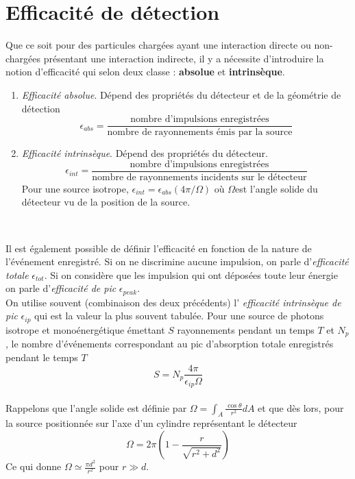 \section{Efficacité de détection}%
Que ce soit pour des particules chargées ayant une interaction 
directe ou non-chargées présentant une interaction indirecte, il 
y a nécessite d'introduire la notion d'efficacité qui selon 
deux classe : \textbf{absolue} et \textbf{intrinsèque}.
\begin{enumerate}
\item \textit{Efficacité absolue}. Dépend des propriétés du 
détecteur et de la géométrie de détection
\begin{equation}
\epsilon_{abs}=\frac{\mbox{nombre d'impulsions enregistr\'ees}
}{\mbox{nombre de rayonnements \'emis par la source}}
\end{equation}
\item \textit{Efficacité intrinsèque}. Dépend des propriétés du
détecteur.
\begin{equation}
\epsilon_{int}=\frac{\mbox{nombre d'impulsions enregistr\'ees}
}{\mbox{nombre de rayonnements incidents sur le d\'etecteur}}
\end{equation}
Pour une source isotrope, $\epsilon_{int}=\epsilon_{abs} (4\pi/
\Omega)$ où $\Omega$est l'angle solide du détecteur vu de la 
position de la source.
\end{enumerate}\ 

Il est également possible de définir l'efficacité en fonction de 
la nature de l'événement enregistré. Si on ne discrimine aucune
impulsion, on parle d'\textit{efficacité totale}  $\epsilon_{tot}$.
Si on considère que les impulsion qui ont déposées toute leur 
énergie on parle d'\textit{efficacité de pic} $\epsilon_{peak}$.\\

On utilise souvent (combinaison des deux précédents) l'\textit{
efficacité intrinsèque de pic} $\epsilon_{ip}$ qui est la 
valeur la plus souvent tabulée. Pour une source de photons isotrope
et monoénergétique émettant $S$ rayonnements pendant un temps $T$
et $N_p$, le nombre d'événements correspondant au pic d'absorption
totale enregistrés pendant le temps $T$
\begin{equation}
S=N_p\frac{4\pi}{\epsilon_{ip}\Omega}
\end{equation}\ \\


Rappelons que l'angle solide est définie par $\Omega=\int_A
\frac{\cos\theta}{r^2}dA$ et que dès lors, pour la source 
positionnée sur l'axe d'un cylindre représentant le détecteur
\begin{equation}
\Omega=2\pi\left( 1-\frac{r}{\sqrt{r^2+d^2}}\right)
\end{equation}
Ce qui donne $\Omega\simeq \frac{\pi d^2}{r^2}$ pour $r\gg d$.



